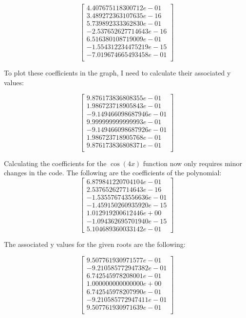 \documentclass{article}
\begin{document}
$$
\begin{bmatrix} 
4.407675118300712e-01\\
3.489272363107635e-16\\
5.739892333362830e-01\\
-2.537652627714643e-16\\
6.516380108719009e-01\\
-1.554312234475219e-15\\
-7.019674665493458e-01\\
\end{bmatrix}
$$

To plot these coefficients in the graph, I need to calculate their associated y values:

$$
\begin{bmatrix}
9.876173836808355e-01\\
1.986723718905843e-01\\
-9.149466098687946e-01\\
9.999999999999993e-01\\
-9.149466098687926e-01\\
1.986723718905768e-01\\
9.876173836808371e-01\\
\end{bmatrix}
$$

Calculating the coefficients for the $\cos(4x)$ function now only requires minor changes in the code. The following are the coefficients of the polynomial:
$$
\begin{bmatrix} 
6.879841220704104e-01\\
2.537652627714643e-16\\
-1.535576743556636e-01\\
-1.459150260935920e-15\\
1.012919200612446e+00\\
-1.094362695701940e-15\\
5.104689360033142e-01
\end{bmatrix}
$$

The associated y values for the given roots are the following:

$$
\begin{bmatrix} 
9.507761930971577e-01\\
-9.210585772947382e-01\\
6.742545978208001e-01\\
1.000000000000000e+00\\
6.742545978207990e-01\\
-9.210585772947411e-01\\
9.507761930971639e-01\\
\end{bmatrix}
$$
\end{document}

